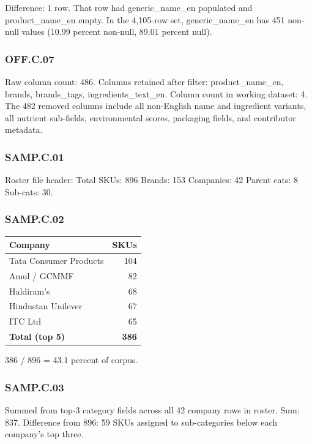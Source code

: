 \documentclass[
  letterpaper,
  DIV=11,
  numbers=noendperiod]{scrartcl}
\newcounter{none} %
\begin{document}
Difference: 1 row. That row had generic\_name\_en populated and
product\_name\_en empty. In the 4,105-row set, generic\_name\_en has 451
non-null values (10.99 percent non-null, 89.01 percent null).

\subsubsection{OFF.C.07}\label{off.c.07}

Raw column count: 486. Columns retained after filter: product\_name\_en,
brands, brands\_tags, ingredients\_text\_en. Column count in working
dataset: 4. The 482 removed columns include all non-English name and
ingredient variants, all nutrient sub-fields, environmental scores,
packaging fields, and contributor metadata.

\subsubsection{SAMP.C.01}\label{samp.c.01}

Roster file header: Total SKUs: 896 \textbar{} Brands: 153 \textbar{}
Companies: 42 \textbar{} Parent cats: 8 \textbar{} Sub-cats: 30.

\subsubsection{SAMP.C.02}\label{samp.c.02}

{\def\LTcaptype{none} %
\begin{longtable}[]{@{}lr@{}}
\toprule\noalign{}
Company & SKUs \\
\midrule\noalign{}
\endhead
\bottomrule\noalign{}
\endlastfoot
Tata Consumer Products & 104 \\
Amul / GCMMF & 82 \\
Haldiram's & 68 \\
Hindustan Unilever & 67 \\
ITC Ltd & 65 \\
\textbf{Total (top 5)} & \textbf{386} \\
\end{longtable}
}

386 / 896 = 43.1 percent of corpus.

\subsubsection{SAMP.C.03}\label{samp.c.03}

Summed from top-3 category fields across all 42 company rows in roster.
Sum: 837. Difference from 896: 59 SKUs assigned to sub-categories below
each company's top three.
\end{document}
